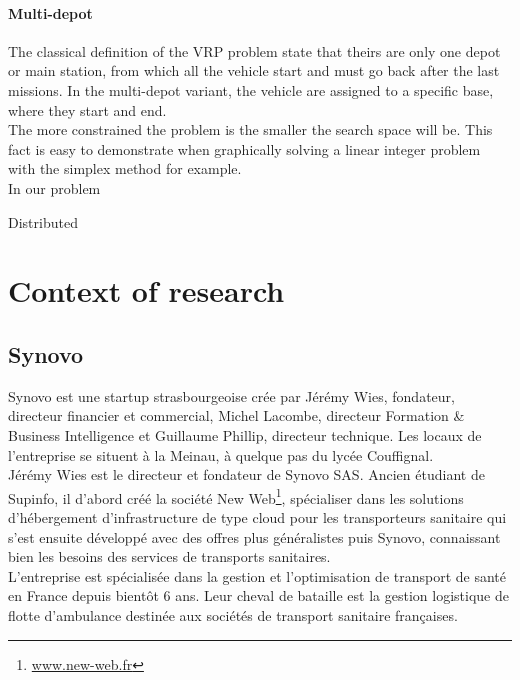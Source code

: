 \documentclass[12pt]{memoir}
\begin{document}
\paragraph{Multi-depot} %
\label{par:Multi-depot}
The classical definition of the VRP problem state that theirs are only one depot or
main station, from which all the vehicle start and must go back after the last
missions. In the multi-depot variant, the vehicle are assigned to a specific base,
where they start and end.\\

The more constrained the problem is the smaller the search space will be. This fact
is easy to demonstrate when graphically solving a linear integer problem with the
simplex method for example.\\
In our problem

Distributed 

\section{Context of research}
\subsection{Synovo} %

Synovo est une startup strasbourgeoise crée par Jérémy Wies, fondateur,
directeur financier et commercial, Michel Lacombe, directeur Formation
\& Business Intelligence et Guillaume Phillip, directeur technique. Les
locaux de l'entreprise se situent à la Meinau, à quelque pas du lycée
Couffignal. \\ 
Jérémy Wies est le directeur et fondateur de Synovo SAS. Ancien étudiant
de Supinfo, il d'abord créé la société New Web\footnote{\url{www.new-web.fr}}, spécialiser dans les
solutions d'hébergement d'infrastructure de type cloud pour les
transporteurs sanitaire qui s'est ensuite développé avec des offres plus
généralistes puis Synovo, connaissant bien les besoins des services de
transports sanitaires. \\
L'entreprise est spécialisée dans la gestion et l'optimisation de
transport de santé en France depuis bientôt 6 ans. Leur cheval de
bataille est la gestion logistique de flotte d'ambulance destinée aux
sociétés de transport sanitaire françaises.
\end{document}
